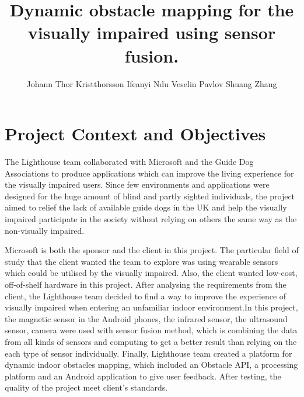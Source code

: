 \documentclass[prodmode,acmtosem]{acmsmall} %
\begin{document}

\title{Dynamic obstacle mapping for the visually impaired using sensor fusion.}
\author{Johann Thor Kristthorsson
Ifeanyi Ndu
Veselin Pavlov
Shuang Zhang
}

\maketitle

\section{Project Context and Objectives}
The Lighthouse team collaborated with Microsoft and the Guide Dog Associations to produce applications which can improve the living experience for the visually impaired users. Since few environments and applications were designed for the huge amount of blind and partly sighted individuals, the project aimed to relief the lack of available guide dogs in the UK and help the visually impaired participate in the society without relying on others the same way as the non-visually impaired. 

Microsoft is both the sponsor and the client in this project. The particular field of study that the client wanted the team to explore was using wearable sensors which could be utilised by the visually impaired. Also, the client wanted low-cost, off-of-shelf hardware in this project. After analysing the requirements from the client, the Lighthouse team decided to find a way to improve the experience of visually impaired when entering an unfamiliar indoor environment.In this project, the magnetic sensor in the Android phones, the infrared sensor, the ultrasound sensor, camera were used with sensor fusion method, which is combining the data from all kinds of sensors and computing to get a better result than relying on the each type of sensor individually.
Finally, Lighthouse team created a platform for dynamic indoor obstacles mapping, which included an Obstacle API, a processing platform and an Android application to give user feedback. After testing, the quality of the project meet client's standards.
\end{document}

